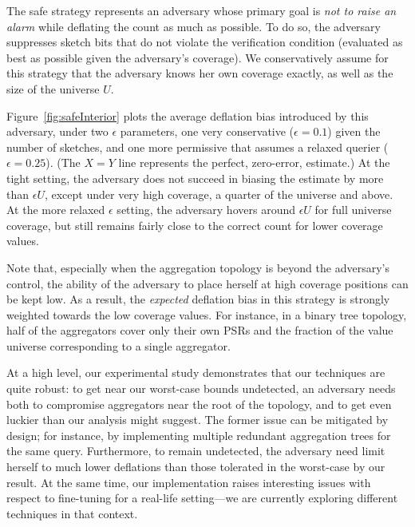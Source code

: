 \documentclass[10pt,twocolumn]{article}
\newcommand\vpar{{\vspace*{0.3em}}}
\newcommand{\stitle}[1]{\vpar\noindent{\bf #1\/}}
\begin{document}
\stitle{Safe Strategy.}
The safe strategy represents an adversary whose primary goal is \emph{not to raise an alarm} while
deflating the count as much as possible.  To do so, the adversary
suppresses sketch bits that do not violate the verification condition
(evaluated as best as possible given the adversary's coverage).  We conservatively
assume for this strategy that the adversary knows her own coverage
exactly, as well as the size of the universe $U$.

Figure~\ref{fig:safeInterior} plots the average deflation bias
introduced by this adversary, under two $\epsilon$ parameters, one very
conservative ($\epsilon = 0.1$) given the number of sketches, and one
more permissive that assumes a relaxed querier ($\epsilon = 0.25$).
(The $X=Y$ line represents the perfect, zero-error, estimate.)
At the tight setting, the adversary does not succeed in biasing the
estimate by more than $\epsilon U$, except under very high coverage, a
quarter of the universe and above.  At the more relaxed $\epsilon$
setting, the adversary hovers around $\epsilon U$ for full universe
coverage, but still remains fairly close to the correct count for lower
coverage values.

Note that, especially when the aggregation topology is beyond the
adversary's control, the ability of the adversary to place herself at
high coverage positions can be kept low.  As a result, the
\emph{expected} deflation bias in this strategy is strongly weighted
towards the low coverage values.  For instance, in a binary tree
topology, half of the aggregators cover only their own PSRs and the
fraction of the value universe corresponding to a single aggregator.




\stitle{Discussion.}
At a high level, our experimental study demonstrates that our
techniques are quite robust: to get near our worst-case bounds
undetected, an adversary needs both to compromise aggregators near the
root of the topology, and to get even luckier than our analysis might
suggest.  The former issue can be mitigated by design; for instance,  by
implementing multiple redundant aggregation trees for the same query.
Furthermore, to remain undetected, the adversary need limit herself to
much lower deflations than those tolerated in the worst-case by our result.
At the same time, our implementation raises interesting issues with respect
to fine-tuning for a real-life 
setting---we are currently exploring different techniques
in that context.
\end{document}
